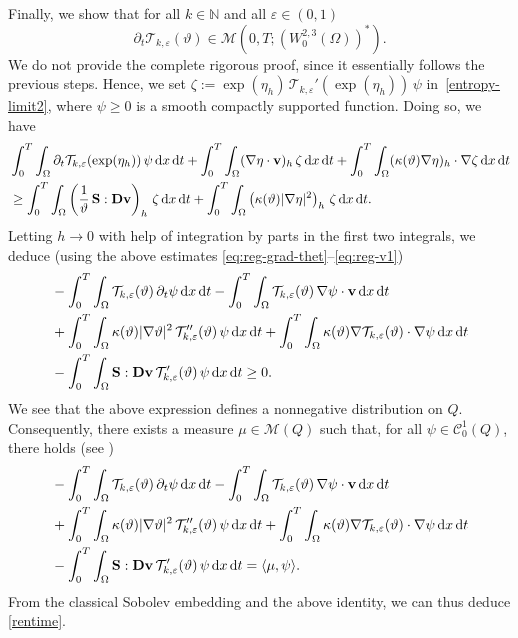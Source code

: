 \documentclass[11pt, a4paper, reqno]{amsart}
\numberwithin{equation}{section}
\newcommand{\dert}{\partial_t}
\newcommand{\vc}[1]{{\bf #1}}
\newcommand{\vv}{\vc{v}}
\newcommand{\thet}{\vartheta}
\renewcommand{\S}{\mathbf{S}}
\newcommand{\D}{\mathbf{D}}
\newcommand{\dt}{\,{\rm d} t }
\newcommand{\dx}{\,{\rm d} {x}}
\newcommand{\dxdt}{\dx  \dt}
\newcommand{\intTO}[1]{\int_0^T \int_{\Omega} #1  \dxdt}
\begin{document}
Finally, we show that for all $k\in \mathbb{N}$ and all $\varepsilon\in (0,1)$
\begin{equation}
\label{rentime}
\partial_t \mathcal{T}_{k,\varepsilon}(\thet) \in \mathcal{M}(0,T; (W^{2,3}_0(\Omega))^*).
\end{equation}
We do not provide the complete rigorous proof, since it essentially follows the previous steps. Hence, we set $\zeta := \exp(\eta_h) \, \mathcal{T}_{k,\varepsilon}'(\exp(\eta_h)) \, \psi$ in~\eqref{entropy-limit2}, where $\psi \ge 0$ is a smooth compactly supported function. Doing so, we have
\begin{equation*}%
\begin{split}
&\intTO{\dert \mathcal{T}_{k,\varepsilon}(\exp(\eta_h)) \, \psi} + \intTO{(\nabla\eta \cdot \vv)_h \, \zeta} + \intTO{(\kappa(\thet) \nabla\eta)_h \cdot \nabla \zeta} \\
& \geq \intTO{\left(\frac{1}{\thet}\, \S : \D{\vv}\right)_h \, \zeta} + \intTO{\left(\kappa(\thet) |\nabla\eta|^2 \right)_h \, \zeta}.
\end{split}
\end{equation*}
Letting $h \to 0$ with help of integration by parts in the first two integrals, we deduce (using the above estimates \eqref{eq:reg-grad-thet}--\eqref{eq:reg-v1})
\begin{equation}\label{entropy-limit2T}
\begin{split}
&-\intTO{\mathcal{T}_{k,\varepsilon}(\thet) \, \dert \psi} - \intTO{\mathcal{T}_{k,\varepsilon}(\thet) \, \nabla \psi \cdot \vv} \\
& + \intTO{\kappa(\thet) |\nabla\thet|^2 \, \mathcal{T}''_{k,\varepsilon}(\thet) \, \psi} + \intTO{\kappa(\thet) \nabla \mathcal{T}_{k,\varepsilon}(\thet) \cdot \nabla \psi} \\
& - \intTO{\S : \D{\vv} \, \mathcal{T}'_{k,\varepsilon}(\thet) \, \psi} \geq 0.
\end{split}
\end{equation}
We see that the above expression defines a nonnegative distribution on $Q$. Consequently, there exists a measure $\mu \in \mathcal{M}(Q)$ such that, for all $\psi \in \mathcal{C}^1_0(Q)$, there holds (see \cite[Theorem 9.13]{Leoni09})
\begin{equation}\label{entropy-limit2TE}
\begin{split}
&-\intTO{\mathcal{T}_{k,\varepsilon}(\thet) \, \dert \psi} - \intTO{\mathcal{T}_{k,\varepsilon}(\thet) \, \nabla \psi \cdot \vv} \\
& + \intTO{\kappa(\thet) |\nabla\thet|^2 \, \mathcal{T}''_{k,\varepsilon}(\thet) \, \psi} + \intTO{\kappa(\thet) \nabla \mathcal{T}_{k,\varepsilon}(\thet) \cdot \nabla \psi} \\
& - \intTO{\S : \D{\vv} \, \mathcal{T}'_{k,\varepsilon}(\thet) \, \psi} = \langle \mu, \psi \rangle.
\end{split}
\end{equation}
From the classical Sobolev embedding and the above identity, we can thus deduce \eqref{rentime}.
\end{document}
